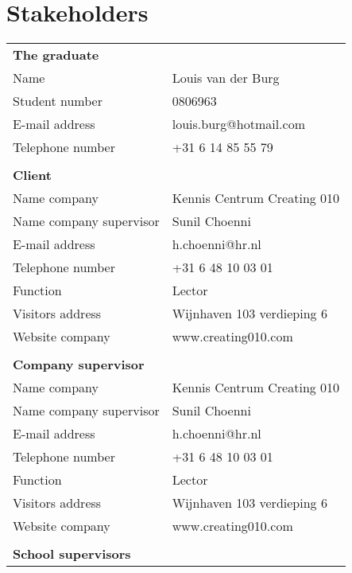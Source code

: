 \chapter{Stakeholders}
\begin{multicols}{2}

   \begin{tabular}
      { l l }
      \textbf{The graduate} & \\
      Name & Louis van der Burg \\
      Student number & 0806963 \\
      E-mail address & louis.burg@hotmail.com \\
      Telephone number & +31 6 14 85 55 79 \\
      & \\
      \textbf{Client} & \\
      Name company & Kennis Centrum Creating 010 \\
      Name company supervisor & Sunil Choenni \\
      E-mail address & h.choenni@hr.nl \\
      Telephone number & +31 6 48 10 03 01  \\
      Function & Lector \\
      Visitors address & Wijnhaven 103 verdieping 6 \\
      Website company & www.creating010.com \\
      & \\
      \textbf{Company supervisor} & \\
      Name company & Kennis Centrum Creating 010 \\
      Name company supervisor & Sunil Choenni \\
      E-mail address & h.choenni@hr.nl \\
      Telephone number & +31 6 48 10 03 01  \\
      Function & Lector \\
      Visitors address & Wijnhaven 103 verdieping 6 \\
      Website company & www.creating010.com \\
      & \\
      \textbf{School supervisors} & \\

\end{tabular}
\end{multicols}
